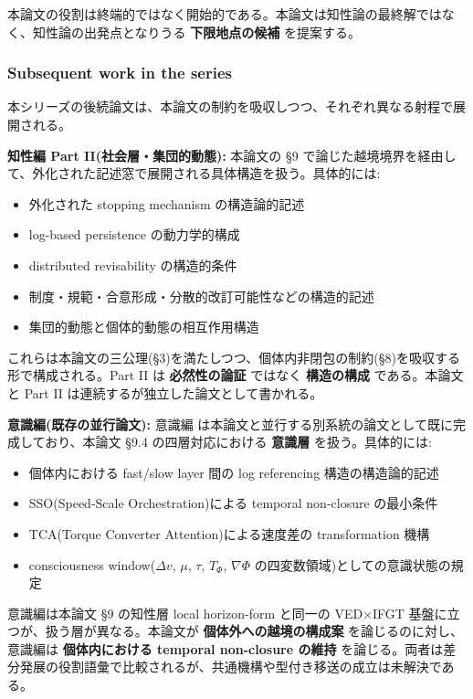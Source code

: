本論文の役割は終端的ではなく開始的である。本論文は知性論の最終解ではなく、知性論の出発点となりうる \textbf{下限地点の候補} を提案する。

\subsubsection{Subsequent work in the series}


本シリーズの後続論文は、本論文の制約を吸収しつつ、それぞれ異なる射程で展開される。

\textbf{知性編 Part II(社会層・集団的動態):}
本論文の \S{}9 で論じた越境境界を経由して、外化された記述窓で展開される具体構造を扱う。具体的には:

\begin{itemize}
\item 外化された stopping mechanism の構造論的記述
\item log-based persistence の動力学的構成
\item distributed revisability の構造的条件
\item 制度・規範・合意形成・分散的改訂可能性などの構造的記述
\item 集団的動態と個体的動態の相互作用構造
\end{itemize}

これらは本論文の三公理(\S{}3)を満たしつつ、個体内非閉包の制約(\S{}8)を吸収する形で構成される。Part II は \textbf{必然性の論証} ではなく \textbf{構造の構成} である。本論文と Part II は連続するが独立した論文として書かれる。

\textbf{意識編(既存の並行論文):}
意識編 \citep{Consciousness} は本論文と並行する別系統の論文として既に完成しており、本論文 \S{}9.4 の四層対応における \textbf{意識層} を扱う。具体的には:

\begin{itemize}
\item 個体内における fast/slow layer 間の log referencing 構造の構造論的記述
\item SSO(Speed-Scale Orchestration)による temporal non-closure の最小条件
\item TCA(Torque Converter Attention)による速度差の transformation 機構
\item consciousness window($\Delta v$, $\mu$, $\tau$, $T_\Phi$, $\nabla\Phi$ の四変数領域)としての意識状態の規定
\end{itemize}

意識編は本論文 \S{}9 の知性層 local horizon-form と同一の VED×IFGT 基盤に立つが、扱う層が異なる。本論文が \textbf{個体外への越境の構成案} を論じるのに対し、意識編は \textbf{個体内における temporal non-closure の維持} を論じる。両者は差分発展の役割語彙で比較されるが、共通機構や型付き移送の成立は未解決である。


